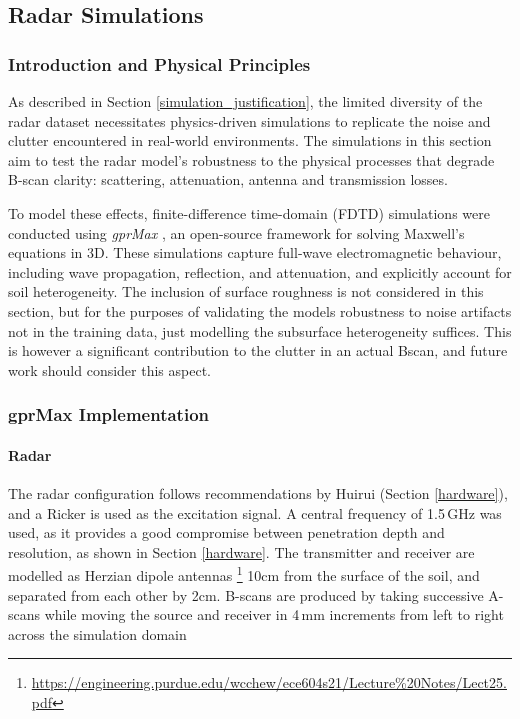 \subsection{Radar Simulations} \label{compvis_radarsims}

    \subsubsection{Introduction and Physical Principles} \label{rory_radar_principles}
    
        \noindent As described in Section \ref{simulation_justification}, the limited diversity of the radar dataset necessitates physics-driven simulations to replicate the noise and clutter encountered in real-world environments. The simulations in this section aim to test the radar model's robustness to the physical processes that degrade B-scan clarity: scattering, attenuation, antenna and transmission losses.
        
        \noindent To model these effects, finite-difference time-domain (FDTD) simulations were conducted using \textit{gprMax} \cite{warren2016gprmax}, an open-source framework for solving Maxwell’s equations in 3D. These simulations capture full-wave electromagnetic behaviour, including wave propagation, reflection, and attenuation, and explicitly account for soil heterogeneity. The inclusion of surface roughness is not considered in this section, but for the purposes of validating the models robustness to noise artifacts not in the training data, just modelling the subsurface heterogeneity suffices. This is however a significant contribution to the clutter in an actual Bscan, and future work should consider this aspect.
     
    
    \subsubsection{gprMax Implementation}

        \paragraph{Radar}
        
             \noindent The radar configuration follows recommendations by Huirui (Section \ref{hardware}), and a Ricker is used as the excitation signal. A central frequency of 1.5\,GHz was used, as it provides a good compromise between penetration depth and resolution, as shown in Section \ref{hardware}. The transmitter and receiver are modelled as Herzian dipole antennas \footnote{\url{https://engineering.purdue.edu/wcchew/ece604s21/Lecture\%20Notes/Lect25.pdf}} 10cm from the surface of the soil, and separated from each other by 2cm. B-scans are produced by taking successive A-scans while moving the source and receiver in 4\,mm increments from left to right across the simulation domain
    
